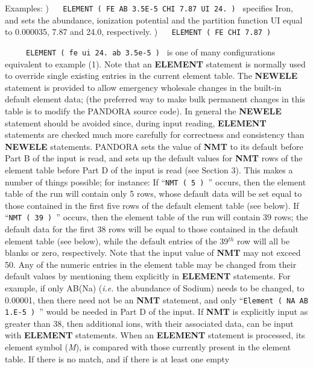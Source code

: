 Examples:
) $\quad$ {\tt ELEMENT  ( FE  AB 3.5E-5  CHI 7.87  UI 24. ) }
\spice \noindent
specifies Iron, and sets the abundance, ionization potential and the
partition function UI equal to 0.000035, 7.87 and 24.0, respectively.
) $\quad$ {\tt ELEMENT  ( FE  CHI 7.87 ) } \par $\phantom{2)} \; \quad$
{\tt ELEMENT  ( fe  ui 24.  ab 3.5e-5 ) } 
\spice \noindent
is one of many configurations equivalent to example (1).
\blankline
Note that an {\bf ELEMENT} statement is normally used to override
single existing entries in the current element table. The
{\bf NEWELE} statement is provided to allow emergency wholesale changes
in the built-in default element data; (the preferred way to make bulk
permanent changes in this table is to modify the PANDORA source code).
In general the {\bf NEWELE} statement should be avoided since,
during input reading, {\bf ELEMENT} statements are checked much more
carefully for correctness and consistency than {\bf NEWELE}
statements.
\ej
PANDORA sets the value of {\bf NMT} to its default before Part B of the input
is read, and sets up the default values for {\bf NMT} rows of the element
table before Part D of the input is read (see Section 3). This makes a
number of things possible; for instance:
\spice \bull If ``{\tt NMT ( 5 ) }'' occurs, then the element table of the 
run will contain only 5 rows, whose default data will be set equal to those
contained in the first five rows of the default element table (see below).
\spice \bull If ``{\tt NMT ( 39 ) }'' occurs, then the element table of the 
run will contain 39 rows; the default data for the first 38 rows will be
equal to those contained in the default element table (see below), while
the default entries of the 39$^{th}$ row will all be blanks or zero,
respectively. Note that the input value of {\bf NMT} may not exceed 50.
\spice \bull Any of the numeric entries in the element table may be changed
from their default values by mentioning them explicitly in
{\bf ELEMENT} statements. For example, if only AB(Na) ({\it i.e.} the
abundance of Sodium) needs to be changed, to 0.00001, then there need
not be an {\bf NMT} statement, and only \break
``{\tt Element ( NA AB 1.E-5 ) }''
would be needed in Part D of the input.
\spice \bull If {\bf NMT} is explicitly input as greater than 38, then 
additional ions, with their associated data, can be input with {\bf ELEMENT}
statements. When an {\bf ELEMENT} statement is processed, its element
symbol ({\it M}), is compared with those currently present in the
element table. If there is no match, and if there is at least one empty

